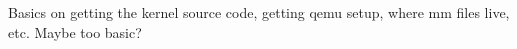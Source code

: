 Basics on getting the kernel source code, getting qemu setup, where mm files
live, etc. Maybe too basic?\\
